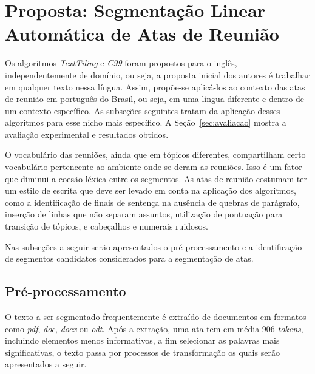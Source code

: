\section{Proposta: Segmentação Linear Automática de Atas de Reunião}
	\label{sec:proposta}






Os algoritmos \textit{TextTiling} e \textit{C99} foram propostos para o inglês, independentemente de domínio, ou seja, a proposta inicial dos autores é trabalhar em qualquer texto nessa língua.
Assim, propõe-se aplicá-los ao contexto das atas de reunião em português do Brasil, ou seja, em uma língua diferente e dentro de um contexto específico. As subseções seguintes tratam da aplicação desses algoritmos para esse nicho mais específico. A Seção~\ref{sec:avaliacao} mostra a avaliação experimental e resultados obtidos.

O vocabulário das reuniões, ainda que em tópicos diferentes, compartilham certo vocabulário pertencente ao ambiente onde se deram as reuniões. Isso é um fator que diminui a coesão léxica entre os segmentos.
As atas de reunião costumam ter um estilo de escrita que deve ser levado em conta na aplicação dos algoritmos, como a identificação de finais de sentença na ausência de quebras de parágrafo, inserção de linhas que não separam assuntos, utilização de pontuação para transição de tópicos, e cabeçalhos e numerais ruidosos. 

Nas subseções a seguir serão apresentados o pré-processamento e a identificação de segmentos candidatos considerados para a segmentação de atas.





\subsection{Pré-processamento}
	\label{subsec:preprocessamento}

	O texto a ser segmentado frequentemente é extraído de documentos em formatos como \textit{pdf}, \textit{doc}, \textit{docx} ou \textit{odt}. Após a extração, uma ata tem em média 906 \textit{tokens}, incluindo elementos menos informativos, a fim selecionar as palavras mais significativas, o texto passa por processos de transformação os quais serão apresentados a seguir.
	

